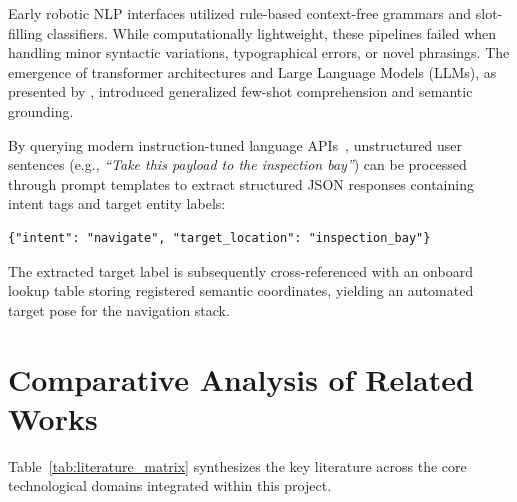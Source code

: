 Early robotic NLP interfaces utilized rule-based context-free grammars and slot-filling classifiers. While computationally lightweight, these pipelines failed when handling minor syntactic variations, typographical errors, or novel phrasings. The emergence of transformer architectures and Large Language Models (LLMs), as presented by \citet{brown2020language}, introduced generalized few-shot comprehension and semantic grounding. 

By querying modern instruction-tuned language APIs~\citep{openai2024gpt}, unstructured user sentences (e.g., \textit{``Take this payload to the inspection bay''}) can be processed through prompt templates to extract structured JSON responses containing intent tags and target entity labels:
\begin{verbatim}
{"intent": "navigate", "target_location": "inspection_bay"}
\end{verbatim}
The extracted target label is subsequently cross-referenced with an onboard lookup table storing registered semantic coordinates, yielding an automated target pose for the navigation stack.

\section{Comparative Analysis of Related Works}
Table~\ref{tab:literature_matrix} synthesizes the key literature across the core technological domains integrated within this project.

